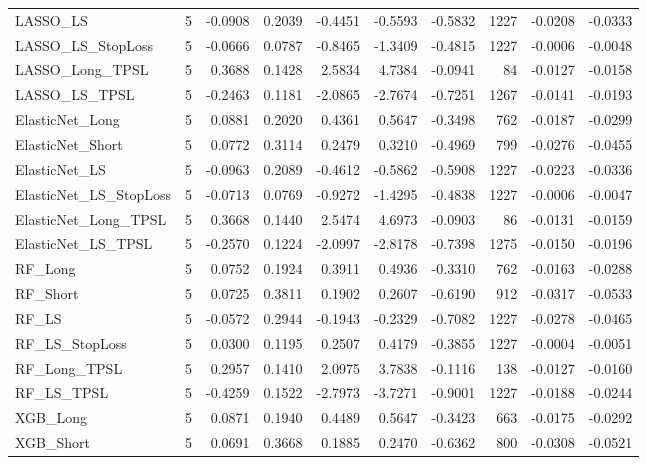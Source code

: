 \begin{tabular}{llrrrrrrrr}
\cline{1-10}
LASSO\_LS & 5 & -0.0908 & 0.2039 & -0.4451 & -0.5593 & -0.5832 & 1227 & -0.0208 & -0.0333 \\
\cline{1-10}
LASSO\_LS\_StopLoss & 5 & -0.0666 & 0.0787 & -0.8465 & -1.3409 & -0.4815 & 1227 & -0.0006 & -0.0048 \\
\cline{1-10}
LASSO\_Long\_TPSL & 5 & 0.3688 & 0.1428 & 2.5834 & 4.7384 & -0.0941 & 84 & -0.0127 & -0.0158 \\
\cline{1-10}
LASSO\_LS\_TPSL & 5 & -0.2463 & 0.1181 & -2.0865 & -2.7674 & -0.7251 & 1267 & -0.0141 & -0.0193 \\
\cline{1-10}
ElasticNet\_Long & 5 & 0.0881 & 0.2020 & 0.4361 & 0.5647 & -0.3498 & 762 & -0.0187 & -0.0299 \\
\cline{1-10}
ElasticNet\_Short & 5 & 0.0772 & 0.3114 & 0.2479 & 0.3210 & -0.4969 & 799 & -0.0276 & -0.0455 \\
\cline{1-10}
ElasticNet\_LS & 5 & -0.0963 & 0.2089 & -0.4612 & -0.5862 & -0.5908 & 1227 & -0.0223 & -0.0336 \\
\cline{1-10}
ElasticNet\_LS\_StopLoss & 5 & -0.0713 & 0.0769 & -0.9272 & -1.4295 & -0.4838 & 1227 & -0.0006 & -0.0047 \\
\cline{1-10}
ElasticNet\_Long\_TPSL & 5 & 0.3668 & 0.1440 & 2.5474 & 4.6973 & -0.0903 & 86 & -0.0131 & -0.0159 \\
\cline{1-10}
ElasticNet\_LS\_TPSL & 5 & -0.2570 & 0.1224 & -2.0997 & -2.8178 & -0.7398 & 1275 & -0.0150 & -0.0196 \\
\cline{1-10}
RF\_Long & 5 & 0.0752 & 0.1924 & 0.3911 & 0.4936 & -0.3310 & 762 & -0.0163 & -0.0288 \\
\cline{1-10}
RF\_Short & 5 & 0.0725 & 0.3811 & 0.1902 & 0.2607 & -0.6190 & 912 & -0.0317 & -0.0533 \\
\cline{1-10}
RF\_LS & 5 & -0.0572 & 0.2944 & -0.1943 & -0.2329 & -0.7082 & 1227 & -0.0278 & -0.0465 \\
\cline{1-10}
RF\_LS\_StopLoss & 5 & 0.0300 & 0.1195 & 0.2507 & 0.4179 & -0.3855 & 1227 & -0.0004 & -0.0051 \\
\cline{1-10}
RF\_Long\_TPSL & 5 & 0.2957 & 0.1410 & 2.0975 & 3.7838 & -0.1116 & 138 & -0.0127 & -0.0160 \\
\cline{1-10}
RF\_LS\_TPSL & 5 & -0.4259 & 0.1522 & -2.7973 & -3.7271 & -0.9001 & 1227 & -0.0188 & -0.0244 \\
\cline{1-10}
XGB\_Long & 5 & 0.0871 & 0.1940 & 0.4489 & 0.5647 & -0.3423 & 663 & -0.0175 & -0.0292 \\
\cline{1-10}
XGB\_Short & 5 & 0.0691 & 0.3668 & 0.1885 & 0.2470 & -0.6362 & 800 & -0.0308 & -0.0521 \\

\end{tabular}
